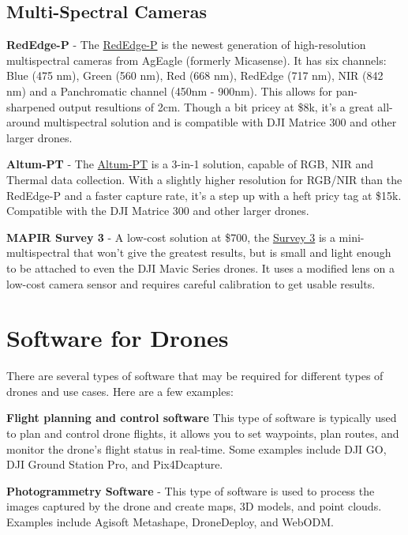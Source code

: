\documentclass[
  12pt,
]{book}
\begin{document}
\subsection{Multi-Spectral Cameras}\label{multi-spectral-cameras}

\textbf{RedEdge-P} - The \href{https://ageagle.com/drone-sensors/rededge-p/}{RedEdge-P} is the newest generation of high-resolution multispectral cameras from AgEagle (formerly Micasense). It has six channels: Blue (475 nm), Green (560 nm), Red (668 nm), RedEdge (717 nm), NIR (842 nm) and a Panchromatic channel (450nm - 900nm). This allows for pan-sharpened output resultions of 2cm. Though a bit pricey at \$8k, it's a great all-around multispectral solution and is compatible with DJI Matrice 300 and other larger drones.

\textbf{Altum-PT} - The \href{https://ageagle.com/drone-sensors/altum-pt/}{Altum-PT} is a 3-in-1 solution, capable of RGB, NIR and Thermal data collection. With a slightly higher resolution for RGB/NIR than the RedEdge-P and a faster capture rate, it's a step up with a heft pricy tag at \$15k. Compatible with the DJI Matrice 300 and other larger drones.

\textbf{MAPIR Survey 3} - A low-cost solution at \$700, the \href{https://www.mapir.camera/pages/survey3-cameras}{Survey 3} is a mini-multispectral that won't give the greatest results, but is small and light enough to be attached to even the DJI Mavic Series drones. It uses a modified lens on a low-cost camera sensor and requires careful calibration to get usable results.

\section{Software for Drones}\label{software-for-drones}

There are several types of software that may be required for different types of drones and use cases. Here are a few examples:

\textbf{Flight planning and control software} This type of software is typically used to plan and control drone flights, it allows you to set waypoints, plan routes, and monitor the drone's flight status in real-time. Some examples include DJI GO, DJI Ground Station Pro, and Pix4Dcapture.

\textbf{Photogrammetry Software} - This type of software is used to process the images captured by the drone and create maps, 3D models, and point clouds. Examples include Agisoft Metashape, DroneDeploy, and WebODM.
\end{document}
